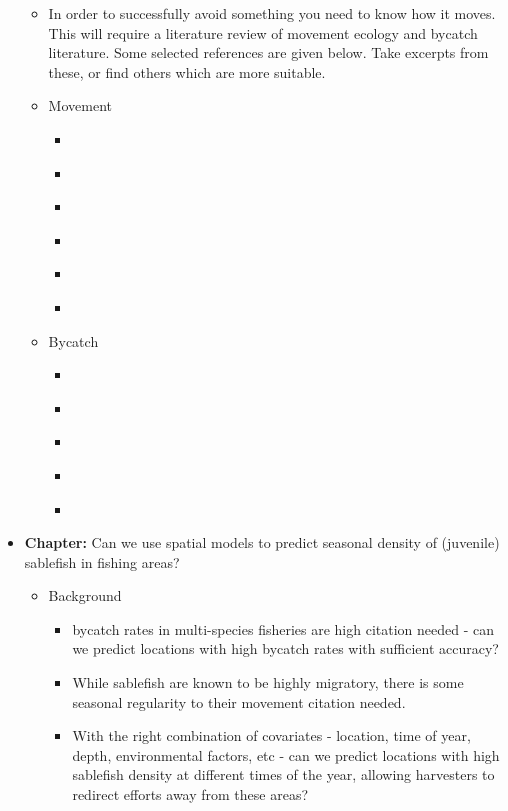 \documentclass{article}
\newcommand{\sj}[1]{{\color{red}\mbox{}\marginpar{\raggedleft\hspace{0pt}*} #1}}
\begin{document}
\begin{itemize}
    \begin{itemize}
      \item In order to successfully avoid something you need to know how it moves. This will require a literature review of movement ecology and bycatch literature. Some selected references are given below. \sj{Take excerpts from these, or find others which are more suitable.}
      \item Movement
        \begin{itemize}
          \item \citep{nathan2008movement}
          \item \citep{fryxell2008multiple}
          \item \citep{pittman2003movements}
          \item \citep{heifetz1991movement}
          \item \citep{getz2008framework}
          \item \citep{righton2008reconstructing}
        \end{itemize}
      \item Bycatch
        \begin{itemize}
          \item \citep{safina2008study}
          \item \citep{hall2005managing}
          \item \citep{lewison2009mapping}
          \item \citep{sims2008modeling}
          \item \citep{hall2005managing}
        \end{itemize}
    \end{itemize}
  \item {\bf Chapter:} Can we use spatial models to predict seasonal density of (juvenile) sablefish in fishing areas?
    \begin{itemize}
      \item Background
        \begin{itemize}
          \item bycatch rates in multi-species fisheries are high \sj{citation needed} - can we predict locations with high bycatch rates with sufficient accuracy?
          \item While sablefish are known to be highly migratory, there is some seasonal regularity to their movement \sj{citation needed}.
          \item With the right combination of covariates - location, time of year, depth, environmental factors, etc - can we predict locations with high sablefish density at different times of the year, allowing harvesters to redirect efforts away from these areas?

\end{itemize}
\end{itemize}
\end{itemize}
\end{document}
